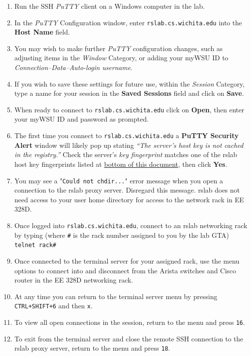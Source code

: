 \documentclass[12pt]{article}
\begin{document}
\begin{flushleft}
\begin{enumerate}
  \item Run the SSH \textit{PuTTY} client on a Windows computer in the lab.
  \item In the \textit{PuTTY} Configuration window, enter \verb|rslab.cs.wichita.edu| into the \textbf{Host Name} field.
  \item You may wish to make further \textit{PuTTY} configuration changes, such as adjusting items in the \textit{Window} Category, or adding your myWSU ID to \textit{Connection--Data--Auto-login username}.
  \item If you wish to save these settings for future use, within the \textit{Session} Category, type a name for your session in the \textbf{Saved Sessions} field and click on \textbf{Save}.
  \item When ready to connect to \verb|rslab.cs.wichita.edu| click on \textbf{Open}, then enter your myWSU ID and password as prompted.
  \item The first time you connect to \verb|rslab.cs.wichita.edu| a \textbf{PuTTY Security Alert} window will likely pop up stating \textit{``The server's host key is not cached in the registry.''} Check the server's \textit{key fingerprint} matches one of the rslab host key fingerprints listed at \hyperref[host_keys]{bottom of this document}, then click \textbf{Yes}.
  \item You may see a "\texttt{Could not chdir...}" error message when you open a connection to the rslab proxy server. Disregard this message. rslab does not need access to your user home directory for access to the network rack in EE 328D.
  \item Once logged into \verb|rslab.cs.wichita.edu|, connect to an rslab networking rack by typing (where \texttt{\#} is the rack number assigned to you by the lab GTA) \break
    \verb|telnet rack#|
  \item Once connected to the terminal server for your assigned rack, use the menu options to connect into and disconnect from the Arista switches and Cisco router in the EE 328D networking rack.
  \item At any time you can return to the terminal server menu by pressing \texttt{CTRL+SHIFT+6} and then \texttt{x}.
  \item To view all open connections in the session, return to the menu and press \texttt{16}.
  \item To exit from the terminal server and close the remote SSH connection to the rslab proxy server, return to the menu and press \texttt{18}.
\end{enumerate}


\end{flushleft}
\end{document}
